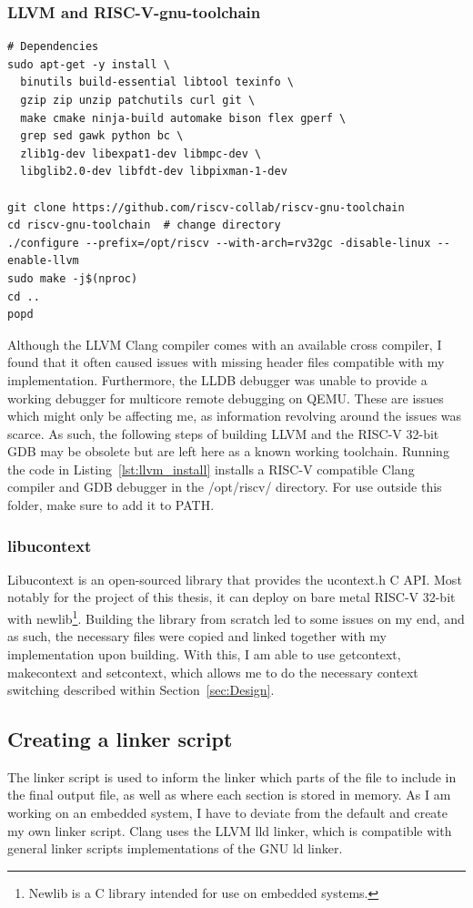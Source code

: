 \subsubsection*{LLVM and RISC-V-gnu-toolchain}
\begin{lstlisting}[caption=Installing LLVM compiler infastructure with RISC-V
32-bit as native target., label=lst:llvm_install, float=h]
# Dependencies
sudo apt-get -y install \
  binutils build-essential libtool texinfo \
  gzip zip unzip patchutils curl git \
  make cmake ninja-build automake bison flex gperf \
  grep sed gawk python bc \
  zlib1g-dev libexpat1-dev libmpc-dev \
  libglib2.0-dev libfdt-dev libpixman-1-dev

git clone https://github.com/riscv-collab/riscv-gnu-toolchain
cd riscv-gnu-toolchain  # change directory
./configure --prefix=/opt/riscv --with-arch=rv32gc -disable-linux --enable-llvm
sudo make -j$(nproc)
cd ..
popd
\end{lstlisting}
Although the LLVM Clang compiler comes with an available cross compiler, I found
that it often caused issues with missing header files compatible with my
implementation. Furthermore, the LLDB debugger was unable to provide a working
debugger for multicore remote debugging on QEMU. These are issues which might
only be affecting me, as information revolving around the issues was scarce. As
such, the following steps of building LLVM and the RISC-V 32-bit GDB may be
obsolete but are left here as a known working toolchain. Running the code in
Listing~\ref{lst:llvm_install} installs a RISC-V compatible Clang compiler and
GDB debugger in the /opt/riscv/ directory. For use outside this folder, make
sure to add it to PATH.

\subsubsection*{libucontext}
Libucontext is an open-sourced library that provides the ucontext.h C API. Most
notably for the project of this thesis, it can deploy on bare metal RISC-V
32-bit with newlib\footnote{Newlib is a C library intended for use on embedded
systems.}. Building the library from scratch led to some issues on my end, and
as such, the necessary files were copied and linked together with my
implementation upon building. With this, I am able to use getcontext,
makecontext and setcontext, which allows me to do the necessary context
switching described within Section~\ref{sec:Design}.


\subsection{Creating a linker script}\label{sec:linker}
The linker script is used to inform the linker which parts of the file to
include in the final output file, as well as where each section is stored in
memory. As I am working on an embedded system, I have to deviate from the
default and create my own linker script. Clang uses the LLVM lld linker, which
is compatible with general linker scripts implementations of the GNU ld
linker\cite{llvm-org-linker}.

